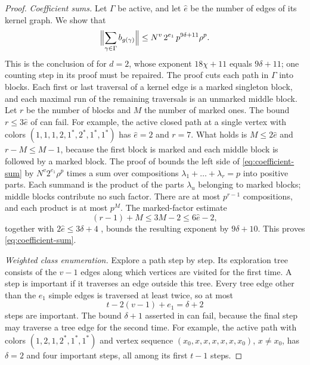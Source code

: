 \documentclass[11pt]{article}
\numberwithin{equation}{section}
\theoremstyle{boldremark}\newtheorem{remark}[theorem]{Remark}
\begin{document}
\begin{proof}
\emph{Coefficient sums.}
Let $\Gamma$ be active, and let $\hat e$ be the number of edges of its
kernel graph. We show that
\begin{equation}
 \Bigl\|\sum_{\gamma\in\Gamma}b_{g(\gamma)}\Bigr\|
 \le N^v\,2^{e_1}\,p^{9\delta+11}\rho^p .
 \label{eq:coefficient-sum}
\end{equation}
This is the conclusion of \cite[Lemma~5.9]{BC} for $d=2$, whose
exponent $18\chi+11$ equals $9\delta+11$; one counting step in its
proof must be repaired. The proof cuts each path in $\Gamma$ into
blocks. Each first or last traversal of a kernel edge is a marked
singleton block, and each maximal run of the remaining traversals is
an unmarked middle block. Let $r$ be the number of blocks and $M$ the
number of marked ones. The bound $r\le3\hat e$ of
\cite[equation~(31)]{BC} can fail. For example, the active closed path
at a single vertex with colors $(1,1,1,2,1^*,2^*,1^*,1^*)$ has
$\hat e=2$ and $r=7$. What holds is $M\le2\hat e$ and $r-M\le M-1$,
because the first block is marked and each middle block is followed by
a marked block. The proof of \cite[Lemma~5.9]{BC} bounds the left side
of \eqref{eq:coefficient-sum} by $N^v2^{e_1}\rho^p$ times a sum over
compositions $\lambda_1+\dots+\lambda_r=p$ into positive parts. Each
summand is the product of the parts $\lambda_u$ belonging to marked
blocks; middle blocks contribute no such factor. There are at most
$p^{r-1}$ compositions, and each product is at most $p^M$. The
marked-factor estimate
\[
 (r-1)+M\le3M-2\le6\hat e-2,
\]
together with $2\hat e\le3\delta+4$ \cite[equation~(29)]{BC}, bounds
the resulting exponent by $9\delta+10$. This proves
\eqref{eq:coefficient-sum}.

\emph{Weighted class enumeration.}
Explore a path step by step. Its exploration tree consists of the
$v-1$ edges along which vertices are visited for the first time. A
step is important if it traverses an edge outside this tree. Every
tree edge other than the $e_1$ simple edges is traversed at least
twice, so at most
\[
 t-2(v-1)+e_1=\delta+2
\]
steps are important. The bound $\delta+1$ asserted in
\cite[proof of Lemma~5.3, p.~25]{BC} can fail, because the final step
may traverse a tree edge for the second time. For example, the active
path with colors $(1,2,1,2^*,1^*,1^*)$ and vertex sequence
$(x_0,x,x,x,x,x,x_0)$, $x\ne x_0$, has $\delta=2$ and four important
steps, all among its first $t-1$ steps.


\end{proof}
\end{document}
